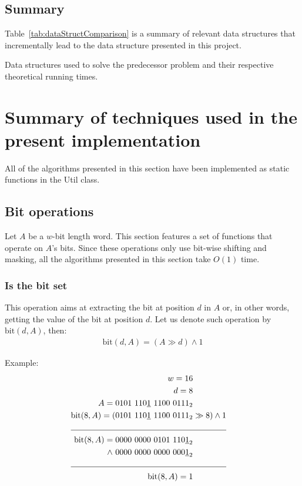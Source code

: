 \subsection{Summary}

Table~\ref{tab:dataStructComparison} is a summary of relevant data structures that incrementally lead to the data structure presented in this project.

\begin{table}[H]
\centering

\caption[Data structure comparison]{Data structures used to solve the predecessor problem and their respective theoretical running times.}
\label{tab:dataStructComparison}
\end{table}

\newpage
\section{Summary of techniques used in the present implementation}

All of the algorithms presented in this section have been implemented as static functions in the {\ttfamily Util} class.

\subsection{Bit operations} \label{sec:bit}

Let $A$ be a $w$-bit length word. This section features a set of functions that operate on $A$'s bits. Since these operations only use bit-wise shifting and masking, all the algorithms presented in this section take $O(1)$ time.

\subsubsection{Is the bit set}

This operation aims at extracting the bit at position $d$ in $A$ or, in other words, getting the value of the bit at position $d$. Let us denote such operation by $\text{bit}(d, A)$, then:
\begin{align*}
    \text{bit}(d, A) = (A \gg d) \wedge 1
\end{align*}

Example:
\begin{align*}
    w = 16\\
    d = 8\\
    A = 0101\ 110\underline{1}\ 1100\ 0111_2& \\
    \text{bit}(8,A) = (0101\ 110\underline{1}\ 1100\ 0111_2& \gg 8) \wedge 1 \\
    \cline{1-2}
    \text{bit}(8,A) = 0000\ 0000\ 0101\ 110\underline{1}_2& \\
    \wedge\ 0000\ 0000\ 0000\ 000\underline{1}_2 \\
    \cline{1-2}
    \text{bit}(8,A) = 1 &
\end{align*}


